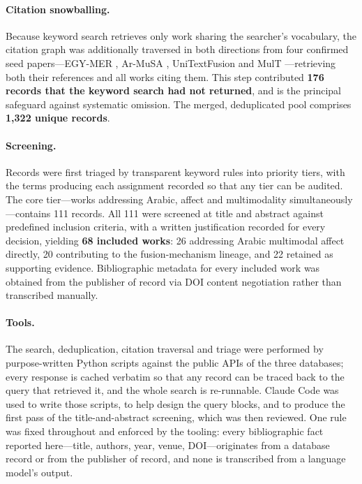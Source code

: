 \documentclass[12pt, a4paper]{article}
\begin{document}
\paragraph{Citation snowballing.} Because keyword search retrieves only work sharing the searcher's vocabulary, the citation graph was additionally traversed in both directions from four confirmed seed papers---EGY-MER \citep{Hussein2025}, Ar-MuSA \citep{Khaled2025}, UniTextFusion \citep{KhaledUniText2025} and MulT \citep{Tsai2019}---retrieving both their references and all works citing them. This step contributed \textbf{176 records that the keyword search had not returned}, and is the principal safeguard against systematic omission. The merged, deduplicated pool comprises \textbf{1{,}322 unique records}.

\paragraph{Screening.} Records were first triaged by transparent keyword rules into priority tiers, with the terms producing each assignment recorded so that any tier can be audited. The core tier---works addressing Arabic, affect and multimodality simultaneously---contains 111 records. All 111 were screened at title and abstract against predefined inclusion criteria, with a written justification recorded for every decision, yielding \textbf{68 included works}: 26 addressing Arabic multimodal affect directly, 20 contributing to the fusion-mechanism lineage, and 22 retained as supporting evidence. Bibliographic metadata for every included work was obtained from the publisher of record via DOI content negotiation rather than transcribed manually.

\paragraph{Tools.} The search, deduplication, citation traversal and triage were performed by purpose-written Python scripts against the public APIs of the three databases; every response is cached verbatim so that any record can be traced back to the query that retrieved it, and the whole search is re-runnable. Claude Code was used to write those scripts, to help design the query blocks, and to produce the first pass of the title-and-abstract screening, which was then reviewed. One rule was fixed throughout and enforced by the tooling: every bibliographic fact reported here---title, authors, year, venue, DOI---originates from a database record or from the publisher of record, and none is transcribed from a language model's output.
\end{document}
